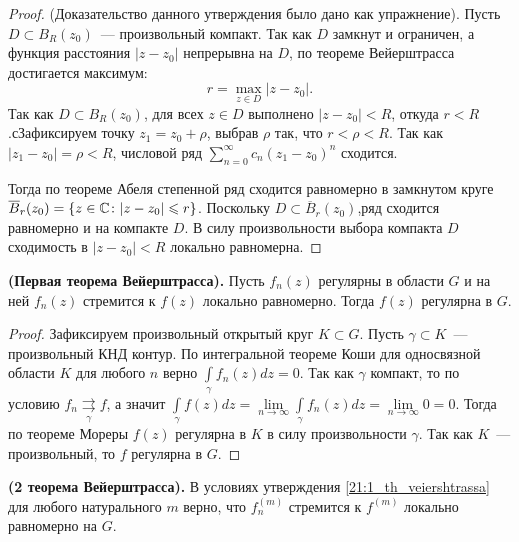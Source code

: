 \begin{proof}
    (Доказательство данного утверждения было дано как упражнение). Пусть \(D \subset B_R(z_0)\)~--- 
    произвольный компакт. Так как \(D\) замкнут и ограничен, а функция расстояния \(|z - z_0|\) 
    непрерывна на \(D\), по теореме Вейерштрасса достигается максимум:
    \[
        r = \max\limits_{z \in D} |z - z_0|.
    \]
    Так как \(D \subset B_R(z_0)\), для всех \(z \in D\) выполнено \(|z - z_0| < R\), откуда 
    \(r < R\).сЗафиксируем точку \(z_1 = z_0 + \rho\), выбрав \(\rho\) так, что \(r < \rho < R\). 
    Так как \(|z_1 - z_0| = \rho < R\), числовой ряд \(\sum\limits_{n=0}^\infty c_n (z_1 - z_0)^n\)
    сходится.

    Тогда по теореме Абеля степенной ряд сходится равномерно в замкнутом круге
    \(\overline{B}_r(z_0) = \{z \in \mathbb{C} \colon |z - z_0| \leqslant r\}\). Поскольку \(D \subset 
    \overline{B}_r(z_0)\),ряд сходится равномерно и на компакте \(D\). В силу произвольности выбора 
    компакта \(D\) сходимость в \(|z - z_0| < R\) локально равномерна.
\end{proof}

\begin{statement}\label{21:1_th_veiershtrassa}
    \textbf{(Первая теорема Вейерштрасса).} Пусть \(f_n(z)\) регулярны в области \(G\) и на ней 
    \(f_n(z)\) стремится к \(f(z)\) локально равномерно. Тогда \(f(z)\) регулярна в \(G\).
\end{statement}

\begin{proof}
    Зафиксируем произвольный открытый круг \(K \subset G\). Пусть \(\gamma \subset K\)~--- 
    произвольный КНД контур. По интегральной теореме Коши для односвязной области \(K\) для любого
    \(n\) верно \(\int\limits_\gamma f_n(z) dz = 0\). Так как \(\gamma\) компакт, то по условию
    \(f_n \mathrel{\mathop{\rightrightarrows}\limits_{\gamma}} f\), а значит \(\int\limits_\gamma
    f(z) dz = \lim\limits_{n \rightarrow \infty} \int\limits_\gamma f_n(z) dz = 
    \lim\limits_{n \rightarrow \infty} 0 = 0\). Тогда по теореме Мореры \(f(z)\) регулярна в \(K\) в
    силу произвольности \(\gamma\). Так как \(K\)~--- произвольный, то \(f\) регулярна в \(G\).
\end{proof}

\begin{statement}
    \textbf{(2 теорема Вейерштрасса).} В условиях утверждения \ref{21:1_th_veiershtrassa} для
    любого натурального \(m\) верно, что \(f_n^{(m)}\) стремится к \(f^{(m)}\) локально равномерно
    на \(G\).
\end{statement}

